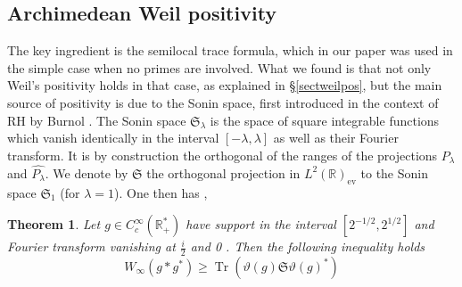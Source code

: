 \documentclass{article}
\newtheorem{thm}{Theorem}[section]
\begin{document}
\subsection{Archimedean  Weil positivity}
The key ingredient is the semilocal trace formula, which in our paper was used in the simple case when no primes are involved. What we found is that not only Weil's positivity holds in that case, as explained in \S \ref{sectweilpos}, but the main source of positivity is due to the Sonin space, first introduced in the context of RH by Burnol \cite{burnol-1,burnol-2,burnol-3}. The Sonin space  ${\mathfrak S}_\lambda$ is the space of square integrable functions which vanish identically in the interval $[-\lambda,\lambda]$ as well as their Fourier transform. It is by construction the orthogonal of the ranges of the projections $P_\lambda$ and $\widehat{P_\lambda} $. We denote by ${\mathfrak S}$ the orthogonal projection in 
$L^2(\mathbb{R})_{\mathrm{ev}}$ to the Sonin space ${\mathfrak S}_1$ (for $\lambda=1$). One then has \cite{weilpos},
\begin{thm} Let $g \in C_c^{\infty}\left(\mathbb{R}_{+}^*\right)$ have support in the interval $\left[2^{-1 / 2}, 2^{1 / 2}\right]$ and Fourier transform vanishing at $\frac{i}{2}$ and 0 . Then the following inequality holds
$$
W_{\infty}\left(g * g^*\right) \geq \operatorname{Tr}\left(\vartheta(g) {\mathfrak S} \vartheta(g)^*\right)
$$
\end{thm}
\end{document}
